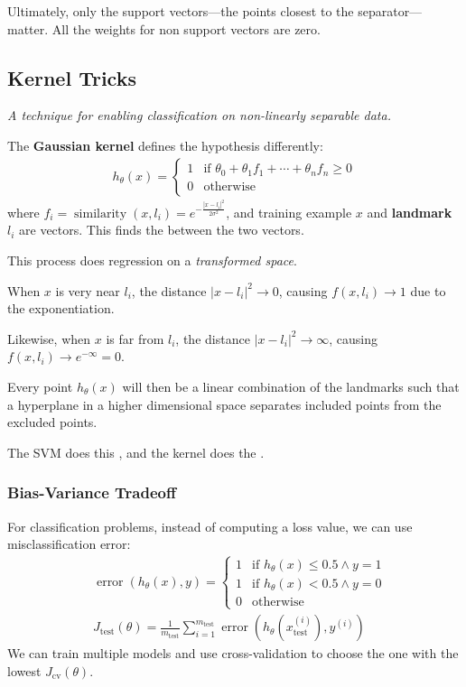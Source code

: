 Ultimately, only the support vectors---the points closest to the separator---matter.
All the weights for non support vectors are zero.

\subsection{Kernel Tricks}
\emph{A technique for enabling classification on non-linearly separable data.}

The \textbf{Gaussian kernel} defines the hypothesis differently:
\begin{align*}
    h_\theta(x) = \begin{cases}
        1 & \text{if } \theta_0 + \theta_1 f_1 + \cdots + \theta_n f_n  \geq 0 \\
        0 & \text{otherwise}
    \end{cases}
\end{align*}
where $f_i = \operatorname{similarity}(x, l_i) = e^{-\frac{|x-l_i|^2}{2\sigma^2}}$,
and training example $x$ and \textbf{landmark} $l_i$ are vectors.
This finds the  between the two vectors.

This process does regression on a \emph{transformed space}.

When $x$ is very near $l_i$, the distance $|x - l_i|^2 \to 0$, causing $f(x, l_i) \to 1$ due to the exponentiation.

Likewise, when $x$ is far from $l_i$, the distance $|x - l_i|^2 \to \infty$, causing $f(x, l_i) \to e^{-\infty} = 0$.

Every point $h_\theta(x)$ will then be a linear combination of the landmarks such that a hyperplane
in a higher dimensional space separates included points from the excluded points.

The SVM does this , and the kernel does the .

\subsubsection{Bias-Variance Tradeoff}
For classification problems, instead of computing a loss value, we can use misclassification error:
\begin{align*}
    & \operatorname{error}(h_\theta(x), y) = \begin{cases}
        1 & \text{if } h_\theta(x) \leq 0.5 \land y = 1 \\
        1 & \text{if } h_\theta(x) < 0.5 \land y = 0 \\
        0 & \text{otherwise}
    \end{cases} \\
    & J_{\text{test}}(\theta) = \frac{1}{m_{\text{test}}} \sum_{i=1}^{m_{\text{test}}}
    \operatorname{error}(h_\theta(x_{\text{test}}^{(i)}), y^{(i)})
\end{align*}
We can train multiple models and use cross-validation to
choose the one with the lowest $J_{\text{cv}}(\theta)$.

